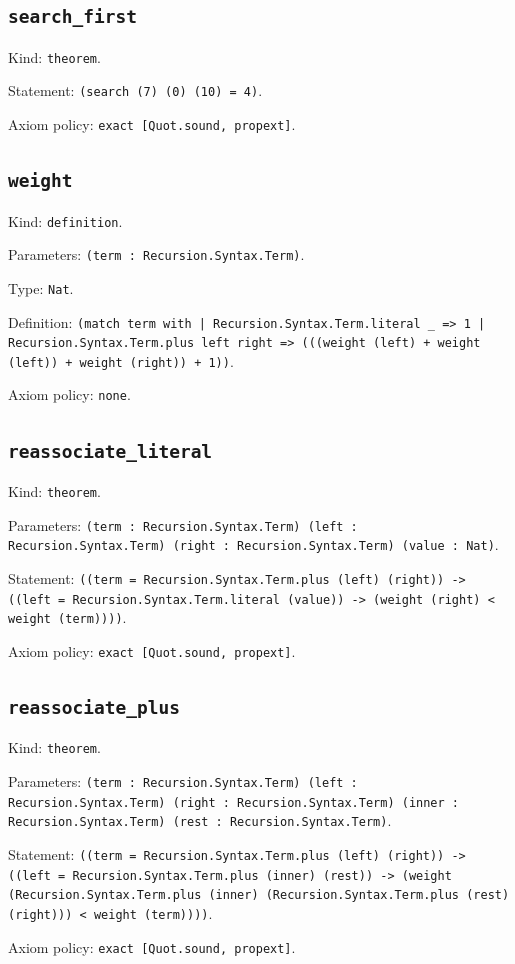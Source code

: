 \documentclass[11pt]{article}
\begin{document}
\subsection*{\texttt{search\_first}}
\noindent Kind: \texttt{theorem}.\par
\noindent Statement: \texttt{(search (7) (0) (10) = 4)}.\par
\noindent Axiom policy: \texttt{exact [Quot.sound, propext]}.\par
\subsection*{\texttt{weight}}
\noindent Kind: \texttt{definition}.\par
\noindent Parameters: \texttt{(term : Recursion.Syntax.Term)}.\par
\noindent Type: \texttt{Nat}.\par
\noindent Definition: \texttt{(match term with | Recursion.Syntax.Term.literal \_ => 1 | Recursion.Syntax.Term.plus left right => (((weight (left) + weight (left)) + weight (right)) + 1))}.\par
\noindent Axiom policy: \texttt{none}.\par
\subsection*{\texttt{reassociate\_literal}}
\noindent Kind: \texttt{theorem}.\par
\noindent Parameters: \texttt{(term : Recursion.Syntax.Term) (left : Recursion.Syntax.Term) (right : Recursion.Syntax.Term) (value : Nat)}.\par
\noindent Statement: \texttt{((term = Recursion.Syntax.Term.plus (left) (right)) -> ((left = Recursion.Syntax.Term.literal (value)) -> (weight (right) < weight (term))))}.\par
\noindent Axiom policy: \texttt{exact [Quot.sound, propext]}.\par
\subsection*{\texttt{reassociate\_plus}}
\noindent Kind: \texttt{theorem}.\par
\noindent Parameters: \texttt{(term : Recursion.Syntax.Term) (left : Recursion.Syntax.Term) (right : Recursion.Syntax.Term) (inner : Recursion.Syntax.Term) (rest : Recursion.Syntax.Term)}.\par
\noindent Statement: \texttt{((term = Recursion.Syntax.Term.plus (left) (right)) -> ((left = Recursion.Syntax.Term.plus (inner) (rest)) -> (weight (Recursion.Syntax.Term.plus (inner) (Recursion.Syntax.Term.plus (rest) (right))) < weight (term))))}.\par
\noindent Axiom policy: \texttt{exact [Quot.sound, propext]}.\par
\end{document}
